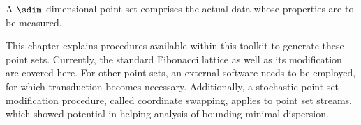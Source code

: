 
A $\sdim$-dimensional point set comprises the actual data whose properties are to be measured.

This chapter explains procedures available within this toolkit to generate these point sets. Currently, the standard Fibonacci lattice as well as its modification are covered here. For other point sets, an external software needs to be employed, for which transduction becomes necessary. Additionally, a stochastic point set modification procedure, called coordinate swapping, applies to point set streams, which showed potential in helping analysis of bounding minimal dispersion.


\clearpage
